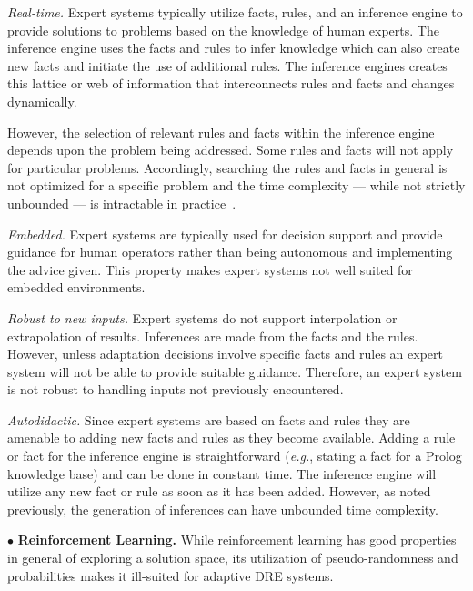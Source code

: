 \documentclass[conference]{IEEEtran}
\begin{document}
\emph{Real-time.} Expert systems typically utilize facts, rules, and an inference engine to provide solutions to problems based on the knowledge of human experts. The inference engine uses the facts and rules to infer knowledge which can also create new facts and initiate the use of additional rules. The inference engines creates this lattice or web of information that interconnects rules and facts and changes dynamically.

However, the selection of relevant rules and facts within the inference engine depends upon the problem being addressed. Some rules and facts will not apply for particular problems. Accordingly, searching the rules and facts in general is not optimized for a specific problem and the time complexity --- while not strictly unbounded --- is intractable in practice~\cite{Sebesta:16}.

\emph{Embedded.} Expert systems are typically used for decision support and provide guidance for human operators rather than being autonomous and implementing the advice given. This property makes expert systems not well suited for embedded environments.

\emph{Robust to new inputs.} Expert systems do not support interpolation or extrapolation of results. Inferences are made from the facts and the rules. However, unless adaptation decisions involve specific facts and rules an expert system will not be able to provide suitable guidance. Therefore, an expert system is not robust to handling inputs not previously encountered.

\emph{Autodidactic.} Since expert systems are based on facts and rules they are amenable to adding new facts and rules as they become available. Adding a rule or fact for the inference engine is straightforward (\emph{e.g.}, stating a fact for a Prolog knowledge base) and can be done in constant time. The inference engine will utilize any new fact or rule as soon as it has been added. However, as noted previously, the generation of inferences can have unbounded time complexity.


$\bullet$ {\bf Reinforcement Learning.} While reinforcement learning has good properties in general of exploring a solution space, its utilization of pseudo-randomness and probabilities makes it ill-suited for adaptive DRE systems.
\end{document}
